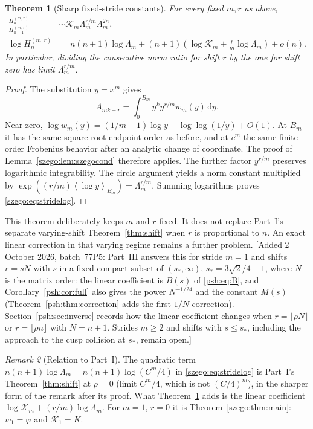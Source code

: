 \documentclass[11pt,a4paper]{article}
\numberwithin{equation}{section}
\newtheorem{theorem}{Theorem}[section]
\theoremstyle{remark}\newtheorem{remark}[theorem]{Remark}
\newcommand{\dd}{\,\mathrm d}
\newcommand{\Lam}{\Lambda}
\newcommand{\mean}[1]{\left\langle#1\right\rangle}
\begin{document}
\begin{theorem}[Sharp fixed-stride constants]\label{szego:thm:strides}
For every fixed $m,r$ as above,
\begin{align}
 \frac{H_n^{(m,r)}}{H_{n-1}^{(m,r)}}
 &\sim \mathcal K_m\Lam_m^{r/m}\Lam_m^{2n},\label{szego:eq:strideh}\\
 \log H_n^{(m,r)}
 &=n(n+1)\log\Lam_m
 +(n+1)\left(\log \mathcal K_m+\frac r m\log\Lam_m\right)+o(n).
 \label{szego:eq:stridelog}
\end{align}
In particular, dividing the consecutive norm ratio for shift $r$ by the
one for shift zero has limit $\Lam_m^{r/m}$.
\end{theorem}
\begin{proof}
The substitution $y=x^m$ gives
\[
 A_{mk+r}=\int_0^{B_m}y^k y^{r/m}w_m(y)\dd y.
\]
Near zero,
$\log w_m(y)=(1/m-1)\log y+\log\log(1/y)+O(1)$.
At $B_m$ it has the same square-root endpoint order as before, and at
$c^m$ the same finite-order Frobenius behavior after an analytic change
of coordinate. The proof of Lemma~\ref{szego:lem:szegocond} therefore applies.
The further factor $y^{r/m}$ preserves logarithmic integrability.
The circle argument yields a norm constant multiplied by
$\exp((r/m)\mean{\log y}_{B_m})=\Lam_m^{r/m}$.
Summing logarithms proves \eqref{szego:eq:stridelog}.
\end{proof}

This theorem deliberately keeps $m$ and $r$ fixed. It does not replace
Part~I's separate varying-shift Theorem~\ref{thm:shift} when $r$ is
proportional to $n$. An exact linear correction in that varying regime
remains a further problem.
[Added 2 October 2026, batch~77P5: Part~III answers this for stride $m=1$
and shifts $r=sN$ with $s$ in a fixed compact subset of $(s_*,\infty)$,
$s_*=3\sqrt2/4-1$, where $N$ is the matrix order: the linear coefficient is
$B(s)$ of \eqref{psh:eq:B}, and Corollary~\ref{psh:cor:full} also gives the
power $N^{-1/24}$ and the constant $M(s)$
(Theorem~\ref{psh:thm:correction} adds the first $1/N$ correction).
Section~\ref{psh:sec:inverse} records how the linear coefficient changes
when $r=\lfloor\rho N\rfloor$ or $r=\lfloor\rho n\rfloor$ with $N=n+1$.
Strides $m\geq2$ and shifts with $s\leq s_*$, including the approach to the
cusp collision at $s_*$, remain open.]

\begin{remark}[Relation to Part~I]\label{szego:rem:strides}
The quadratic term $n(n+1)\log\Lambda_m=n(n+1)\log(C^m/4)$ in
\eqref{szego:eq:stridelog} is Part~I's Theorem~\ref{thm:shift} at $\rho=0$
(limit $C^m/4$, which is not $(C/4)^m$), in the sharper form of the remark
after its proof. What Theorem~\ref{szego:thm:strides} adds is the linear
coefficient $\log\mathcal K_m+(r/m)\log\Lambda_m$. For $m=1$, $r=0$ it is
Theorem~\ref{szego:thm:main}: $w_1=\varphi$ and $\mathcal K_1=K$.
\end{remark}
\end{document}
